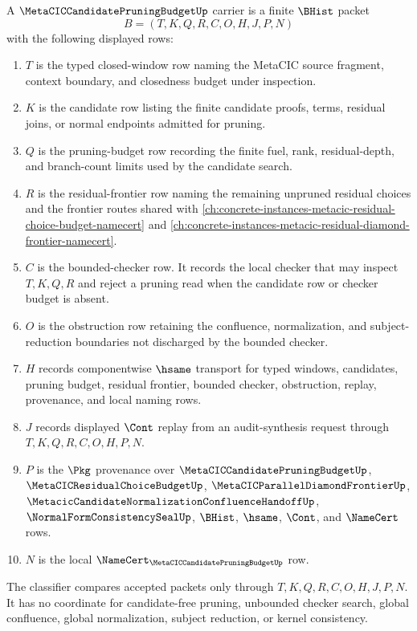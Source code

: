 \begin{definition}
\label{def:metacic-candidate-pruning-budget-carrier}
A $\MetaCICCandidatePruningBudgetUp$ carrier is a finite $\BHist$ packet
$$
B=(T,K,Q,R,C,O,H,J,P,N)
$$
with the following displayed rows:
\begin{enumerate}
\item $T$ is the typed closed-window row naming the MetaCIC source fragment, context boundary, and closedness budget under inspection.
\item $K$ is the candidate row listing the finite candidate proofs, terms, residual joins, or normal endpoints admitted for pruning.
\item $Q$ is the pruning-budget row recording the finite fuel, rank, residual-depth, and branch-count limits used by the candidate search.
\item $R$ is the residual-frontier row naming the remaining unpruned residual choices and the frontier routes shared with \autoref{ch:concrete-instances-metacic-residual-choice-budget-namecert} and \autoref{ch:concrete-instances-metacic-residual-diamond-frontier-namecert}.
\item $C$ is the bounded-checker row. It records the local checker that may inspect $T,K,Q,R$ and reject a pruning read when the candidate row or checker budget is absent.
\item $O$ is the obstruction row retaining the confluence, normalization, and subject-reduction boundaries not discharged by the bounded checker.
\item $H$ records componentwise $\hsame$ transport for typed windows, candidates, pruning budget, residual frontier, bounded checker, obstruction, replay, provenance, and local naming rows.
\item $J$ records displayed $\Cont$ replay from an audit-synthesis request through $T,K,Q,R,C,O,H,P,N$.
\item $P$ is the $\Pkg$ provenance over $\MetaCICCandidatePruningBudgetUp$, $\MetaCICResidualChoiceBudgetUp$, $\MetaCICParallelDiamondFrontierUp$, $\MetacicCandidateNormalizationConfluenceHandoffUp$, $\NormalFormConsistencySealUp$, $\BHist$, $\hsame$, $\Cont$, and $\NameCert$ rows.
\item $N$ is the local $\NameCert_{\MetaCICCandidatePruningBudgetUp}$ row.
\end{enumerate}
The classifier compares accepted packets only through $T,K,Q,R,C,O,H,J,P,N$. It has no coordinate for candidate-free pruning, unbounded checker search, global confluence, global normalization, subject reduction, or kernel consistency.
\end{definition}

